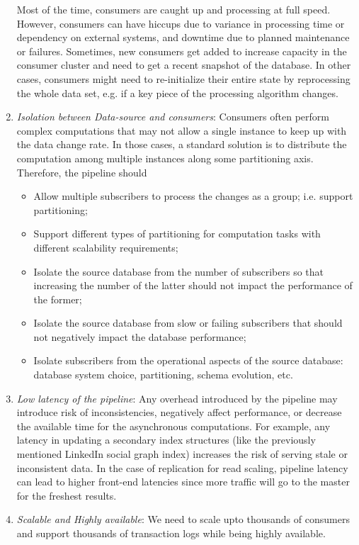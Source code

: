 \begin{enumerate}[I]
Most of the time, consumers are caught up and processing at full speed. However, consumers can have hiccups due to variance in processing time or dependency on external systems, and downtime due to planned maintenance or failures. Sometimes, new consumers get added to increase capacity in the consumer cluster and need to get a recent snapshot of the database. In other cases, consumers might need to re-initialize their entire state by reprocessing the whole data set, e.g. if a key piece of the processing algorithm changes. 
\item \emph{Isolation between Data-source and consumers}: 
Consumers often perform complex computations that may not allow a single instance to keep up with the data change rate. In those cases, a standard solution is to distribute the computation among multiple instances along some partitioning axis.
Therefore, the pipeline should
\begin{itemize}
\item Allow multiple subscribers to process the changes as a group; i.e. support partitioning;
\item Support different types of partitioning for computation tasks with different scalability requirements;
\item Isolate the source database from the number of subscribers so that increasing the number of the latter should not impact the performance of the former;
\item Isolate the source database from slow or failing subscribers that should not negatively impact the database performance;
\item Isolate subscribers from the operational aspects of the source database: database system choice, partitioning, schema evolution, etc.  
\end{itemize}
\item \emph{Low latency of the pipeline}: Any overhead introduced by the pipeline may introduce risk of inconsistencies, negatively affect performance, or decrease the available time for the asynchronous computations. For example, any latency in updating a secondary index structures (like the previously mentioned LinkedIn social graph index) increases the risk of serving stale or inconsistent data. In the case of replication for read scaling, pipeline latency can lead to higher front-end latencies since more traffic will go to the master for the freshest results. 
\item \emph{Scalable and Highly available}: We need to scale upto thousands of consumers and support thousands of transaction logs while being highly available. 
\end{enumerate}
   
